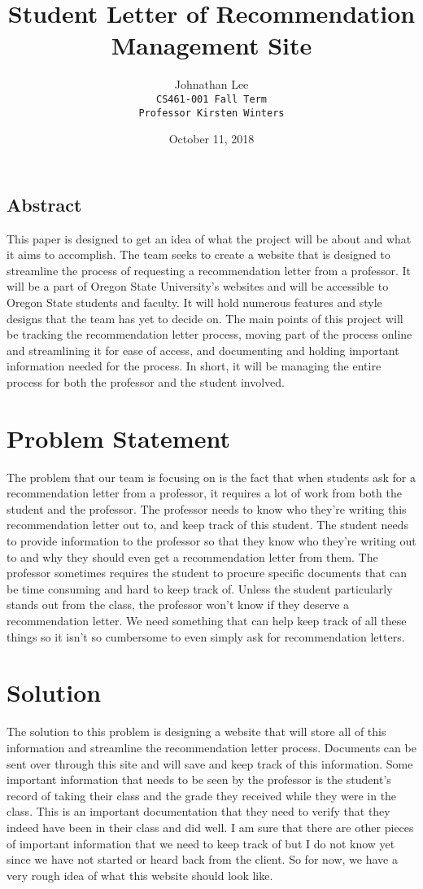 \documentclass[letterpaper, 10pt, draftclsnofoot, onecolumn, IEEETran]{article}
\title{Student Letter of Recommendation Management Site}
\author{Johnathan Lee \\ {\tt CS461-001 Fall Term} \\ {\tt Professor Kirsten Winters}}
\date{October 11, 2018}
\begin{document}
\maketitle

\noindent
\subsection*{Abstract}
This paper is designed to get an idea of what the project will be about and what it aims to accomplish. The team seeks to create a website that is designed to streamline the process of requesting a recommendation letter from a professor. It will be a part of Oregon State University's websites and will be accessible to Oregon State students and faculty. It will hold numerous features and style designs that the team has yet to decide on. The main points of this project will be tracking the recommendation letter process, moving part of the process online and streamlining it for ease of access, and documenting and holding important information needed for the process. In short, it will be managing the entire process for both the professor and the student involved.
\newpage
\section*{Problem Statement}
The problem that our team is focusing on is the fact that when students ask for a recommendation letter from a professor, it requires a lot of work from both the student and the professor. The professor needs to know who they're writing this recommendation letter out to, and keep track of this student. The student needs to provide information to the professor so that they know who they're writing out to and why they should even get a recommendation letter from them. The professor sometimes requires the student to procure specific documents that can be time consuming and hard to keep track of. Unless the student particularly stands out from the class, the professor won't know if they deserve a recommendation letter. We need something that can help keep track of all these things so it isn't so cumbersome to even simply ask for recommendation letters.

\section*{Solution}
The solution to this problem is designing a website that will store all of this information and streamline the recommendation letter process. Documents can be sent over through this site and will save and keep track of this information. Some important information that needs to be seen by the professor is the student's record of taking their class and the grade they received while they were in the class. This is an important documentation that they need to verify that they indeed have been in their class and did well. I am sure that there are other pieces of important information that we need to keep track of but I do not know yet since we have not started or heard back from the client. So for now, we have a very rough idea of what this website should look like.
\end{document}
